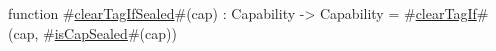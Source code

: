 function #\hyperref[sailRISCVzclearTagIfSealed]{clearTagIfSealed}#(cap) : Capability -> Capability =
    #\hyperref[sailRISCVzclearTagIf]{clearTagIf}#(cap, #\hyperref[sailRISCVzisCapSealed]{isCapSealed}#(cap))
